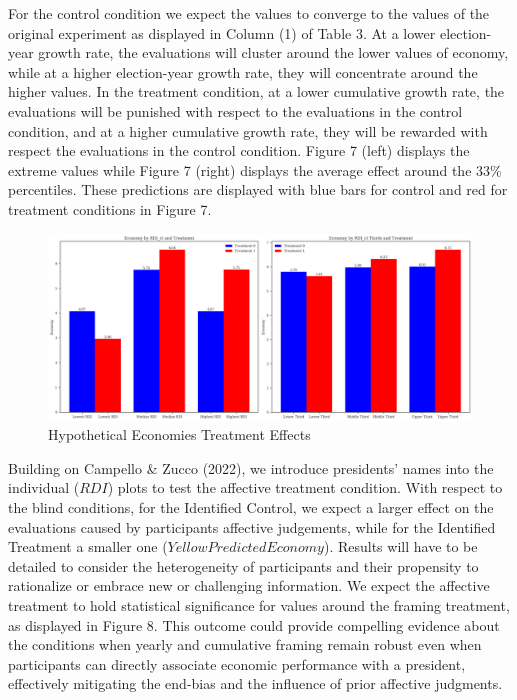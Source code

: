 \documentclass[
]{article}
\begin{document}
\begin{center}
  
\end{center}

For the control condition we expect the values to converge to the values
of the original experiment as displayed in Column (1) of Table 3. At a
lower election-year growth rate, the evaluations will cluster around the
lower values of economy, while at a higher election-year growth rate,
they will concentrate around the higher values. In the treatment
condition, at a lower cumulative growth rate, the evaluations will be
punished with respect to the evaluations in the control condition, and
at a higher cumulative growth rate, they will be rewarded with respect
the evaluations in the control condition. Figure 7 (left) displays the
extreme values while Figure 7 (right) displays the average effect around
the 33\% percentiles. These predictions are displayed with blue bars for
control and red for treatment conditions in Figure 7.

\begin{figure}
\hypertarget{fig:label}{%
\centering
\includegraphics[width=1\textwidth,height=1\textheight]{treat_lowthird.png}
\caption{Hypothetical Economies Treatment Effects}\label{fig:label}
}
\end{figure}

Building on Campello \& Zucco (2022), we introduce presidents' names
into the individual (\(RDI\)) plots to test the affective treatment
condition. With respect to the blind conditions, for the Identified
Control, we expect a larger effect on the evaluations caused by
participants affective judgements, while for the Identified Treatment a
smaller one (\(Yellow Predicted Economy\)). Results will have to be
detailed to consider the heterogeneity of participants and their
propensity to rationalize or embrace new or challenging information. We
expect the affective treatment to hold statistical significance for
values around the framing treatment, as displayed in Figure 8. This
outcome could provide compelling evidence about the conditions when
yearly and cumulative framing remain robust even when participants can
directly associate economic performance with a president, effectively
mitigating the end-bias and the influence of prior affective judgments.
\end{document}
